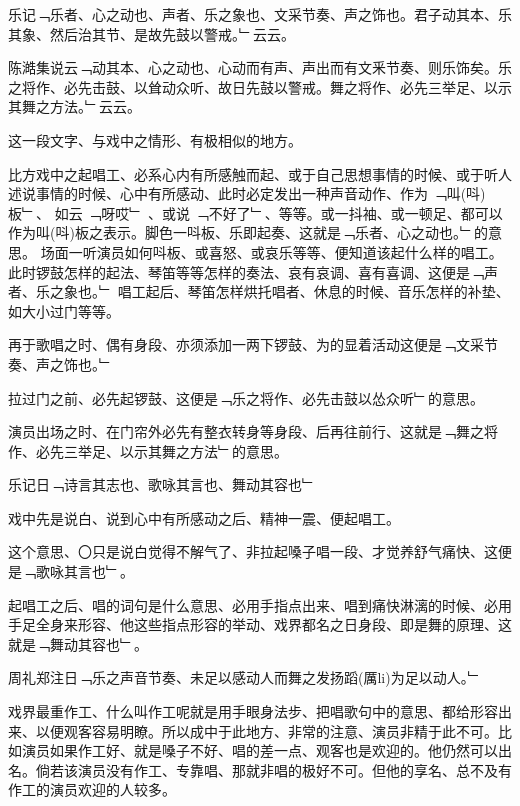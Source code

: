 \documentclass{zhvt-classic}
\begin{document}
\clearpage

\begin{preface}
  乐记﹁乐者、心之动也、声者、乐之象也、文采节奏、声之饰也。君子动其本、乐其象、然后治其节、是故先鼓以警戒。﹂云云。
\end{preface}

\begin{preface}
  陈澔集说云﹁动其本、心之动也、心动而有声、声出而有文釆节奏、则乐饰矣。乐之将作、必先击鼓、以耸动众听、故日先鼓以警戒。舞之将作、必先三举足、以示其舞之方法。﹂云云。
\end{preface}

这一段文字、与戏中之情形、有极相似的地方。

比方戏中之起唱工、必系心内有所感触而起、或于自己思想事情的时候、或于听人述说事情的时候、心中有所感动、此时必定发出一种声音动作、作为 ﹁叫(呌)板﹂、 如云 ﹁呀哎﹂ 、或说 ﹁不好了﹂、等等。或一抖袖、或一顿足、都可以作为叫(呌)板之表示。脚色一呌板、乐即起奏、这就是﹁乐者、心之动也。﹂的意思。
场面一听演员如何呌板、或喜怒、或哀乐等等、便知道该起什么样的唱工。此时锣鼓怎样的起法、琴笛等等怎样的奏法、哀有哀调、喜有喜调、这便是﹁声者、乐之象也。﹂ 唱工起后、琴笛怎样烘托唱者、休息的时候、音乐怎样的补垫、如大小过门等等。

再于歌唱之时、偶有身段、亦须添加一两下锣鼓、为的显着活动这便是﹁文采节奏、声之饰也。﹂

拉过门之前、必先起锣鼓、这便是﹁乐之将作、必先击鼓以怂众听﹂的意思。

演员出场之时、在门帘外必先有整衣转身等身段、后再往前行、这就是﹁舞之将作、必先三举足、以示其舞之方法﹂的意思。

\begin{preface}
  乐记日﹁诗言其志也、歌咏其言也、舞动其容也﹂
\end{preface}

戏中先是说白、说到心中有所感动之后、精神一震、便起唱工。

这个意思、〇只是说白觉得不解气了、非拉起嗓子唱一段、才觉养舒气痛快、这便是﹁歌咏其言也﹂。

起唱工之后、唱的词句是什么意思、必用手指点出来、唱到痛快淋漓的时候、必用手足全身来形容、他这些指点形容的举动、戏界都名之日身段、即是舞的原理、这就是﹁舞动其容也﹂。

\clearpage

\begin{preface}
  周礼郑注日﹁乐之声音节奏、未足以感动人而舞之发扬蹈(厲li)为足以动人。﹂
\end{preface}

戏界最重作工、什么叫作工呢就是用手眼身法步、把唱歌句中的意思、都给形容出来、以便观客容易明瞭。所以成中于此地方、非常的注意、演员非精于此不可。比如演员如果作工好、就是嗓子不好、唱的差一点、观客也是欢迎的。他仍然可以出名。倘若该演员没有作工、专靠唱、那就非唱的极好不可。但他的享名、总不及有作工的演员欢迎的人较多。
\end{document}
